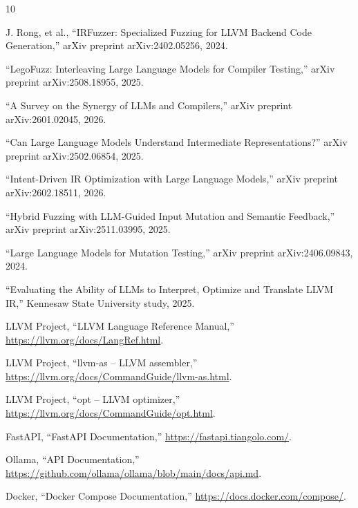 \documentclass[journal]{IEEEtran}
\begin{document}
\begin{thebibliography}{10}

J. Rong, et al., ``IRFuzzer: Specialized Fuzzing for LLVM Backend Code Generation,'' arXiv preprint arXiv:2402.05256, 2024.

``LegoFuzz: Interleaving Large Language Models for Compiler Testing,'' arXiv preprint arXiv:2508.18955, 2025.

``A Survey on the Synergy of LLMs and Compilers,'' arXiv preprint arXiv:2601.02045, 2026.

``Can Large Language Models Understand Intermediate Representations?'' arXiv preprint arXiv:2502.06854, 2025.

``Intent-Driven IR Optimization with Large Language Models,'' arXiv preprint arXiv:2602.18511, 2026.

``Hybrid Fuzzing with LLM-Guided Input Mutation and Semantic Feedback,'' arXiv preprint arXiv:2511.03995, 2025.

``Large Language Models for Mutation Testing,'' arXiv preprint arXiv:2406.09843, 2024.

``Evaluating the Ability of LLMs to Interpret, Optimize and Translate LLVM IR,'' Kennesaw State University study, 2025.

LLVM Project, ``LLVM Language Reference Manual,'' \url{https://llvm.org/docs/LangRef.html}.

LLVM Project, ``llvm-as -- LLVM assembler,'' \url{https://llvm.org/docs/CommandGuide/llvm-as.html}.

LLVM Project, ``opt -- LLVM optimizer,'' \url{https://llvm.org/docs/CommandGuide/opt.html}.

FastAPI, ``FastAPI Documentation,'' \url{https://fastapi.tiangolo.com/}.

Ollama, ``API Documentation,'' \url{https://github.com/ollama/ollama/blob/main/docs/api.md}.

Docker, ``Docker Compose Documentation,'' \url{https://docs.docker.com/compose/}.

\end{thebibliography}
\end{document}
